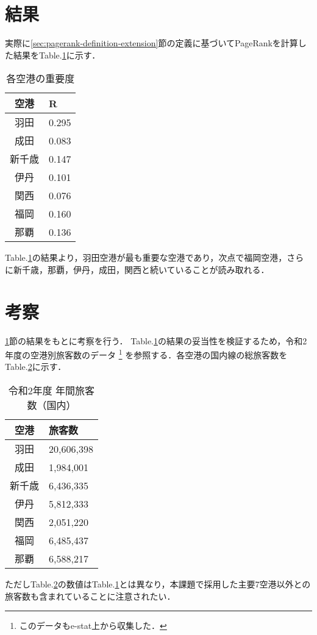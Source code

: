 \documentclass[a4j, dvipdfmx, twocolumn]{jsarticle}
\newcommand{\tabref}[1]{Table.\ref{#1}}
\newcommand{\secref}[1]{\ref{#1}節}
\begin{document}
\section{結果}
\label{sec:result}
実際に\secref{sec:pagerank-definition-extension}の定義に基づいてPageRankを計算した結果を\tabref{tab:pagerank}に示す．

\begin{table}[htb]
    \begin{tabular}{cl}
      \hline
      空港 & R \\
      \hline
      \hline
      羽田 & 0.295 \\
      成田 & 0.083 \\
      新千歳 & 0.147 \\
      伊丹 & 0.101 \\
      関西 & 0.076 \\
      福岡 & 0.160 \\
      那覇 & 0.136 \\
      \hline
    \end{tabular}
  \centering
  \caption{各空港の重要度}
  \label{tab:pagerank}
\end{table}

\tabref{tab:pagerank}の結果より，羽田空港が最も重要な空港であり，次点で福岡空港，さらに新千歳，那覇，伊丹，成田，関西と続いていることが読み取れる．

\section{考察}
\secref{sec:result}の結果をもとに考察を行う．
\tabref{tab:pagerank}の結果の妥当性を検証するため，令和2年度の空港別旅客数のデータ
\footnote{このデータもe-stat上から収集した．}
を参照する．各空港の国内線の総旅客数を\tabref{tab:airport-passenger-number}に示す．
\begin{table}[htb]
  \begin{tabular}{cl}
    \hline
    空港 & 旅客数 \\
    \hline
    \hline
    羽田 & 20,606,398 \\
    成田 & 1,984,001 \\
    新千歳 & 6,436,335 \\
    伊丹 & 5,812,333 \\
    関西 & 2,051,220 \\
    福岡 & 6,485,437 \\
    那覇 & 6,588,217 \\
    \hline
  \end{tabular}
  \centering
  \caption{令和2年度 年間旅客数（国内）}
  \label{tab:airport-passenger-number}
\end{table}
ただし\tabref{tab:airport-passenger-number}の数値は\tabref{tab:pagerank}とは異なり，本課題で採用した主要7空港以外との旅客数も含まれていることに注意されたい．
\end{document}
